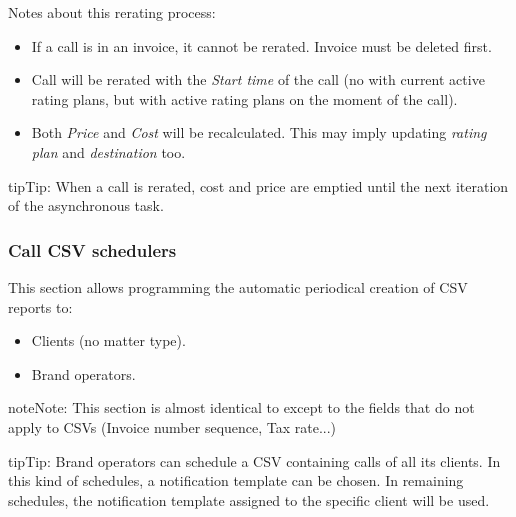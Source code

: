 \documentclass[letterpaper,10pt,english]{sphinxmanual}
\begin{document}
Notes about this rerating process:
\begin{itemize}
\item {} 
If a call is in an invoice, it cannot be rerated. Invoice must be deleted first.

\item {} 
Call will be rerated with the \emph{Start time} of the call (no with current active rating plans, but with active rating plans
on the moment of the call).

\item {} 
Both \emph{Price} and \emph{Cost} will be recalculated. This may imply updating \emph{rating plan} and \emph{destination} too.

\end{itemize}

\begin{notice}{tip}{Tip:}
When a call is rerated, cost and price are emptied until the next iteration of the asynchronous task.
\end{notice}


\subsubsection{Call CSV schedulers}
\label{administration_portal/client/residential/calls/call_csv_schedulers:call-csv-schedulers}\label{administration_portal/client/residential/calls/call_csv_schedulers::doc}
This section allows programming the automatic periodical creation of CSV reports to:
\begin{itemize}
\item {} 
Clients (no matter type).

\item {} 
Brand operators.

\end{itemize}

\begin{notice}{note}{Note:}
This section is almost identical to {\hyperref[administration_portal/brand/invoicing/invoice_schedulers:invoice\string-schedulers]{}} except to the
fields that do not apply to CSVs (Invoice number sequence, Tax rate...)
\end{notice}

\begin{notice}{tip}{Tip:}
Brand operators can schedule a CSV containing calls of all its clients.
In this kind of schedules, a notification template can be chosen. In remaining
schedules, the notification template assigned to the specific client will be used.
\end{notice}
\end{document}
